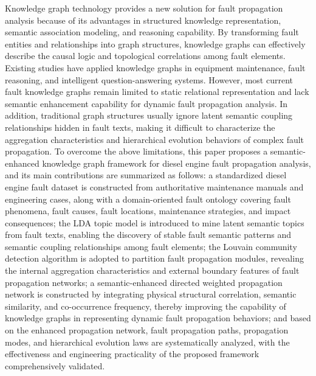 \documentclass[conference]{IEEEconf}
\begin{document}
Knowledge graph technology provides a new solution for fault propagation analysis because of its advantages in structured knowledge representation, semantic association modeling, and reasoning capability\cite{paul2019compact}. By transforming fault entities and relationships into graph structures, knowledge graphs can effectively describe the causal logic and topological correlations among fault elements. Existing studies have applied knowledge graphs in equipment maintenance, fault reasoning, and intelligent question-answering systems. However, most current fault knowledge graphs remain limited to static relational representation and lack semantic enhancement capability for dynamic fault propagation analysis\cite{chen2024information}. In addition, traditional graph structures usually ignore latent semantic coupling relationships hidden in fault texts, making it difficult to characterize the aggregation characteristics and hierarchical evolution behaviors of complex fault propagation.
To overcome the above limitations, this paper proposes a semantic-enhanced knowledge graph framework for diesel engine fault propagation analysis, and its main contributions are summarized as follows: a standardized diesel engine fault dataset is constructed from authoritative maintenance manuals and engineering cases, along with a domain-oriented fault ontology covering fault phenomena, fault causes, fault locations, maintenance strategies, and impact consequences; the LDA topic model is introduced to mine latent semantic topics from fault texts, enabling the discovery of stable fault semantic patterns and semantic coupling relationships among fault elements; the Louvain community detection algorithm is adopted to partition fault propagation modules, revealing the internal aggregation characteristics and external boundary features of fault propagation networks; a semantic-enhanced directed weighted propagation network is constructed by integrating physical structural correlation, semantic similarity, and co-occurrence frequency, thereby improving the capability of knowledge graphs in representing dynamic fault propagation behaviors; and based on the enhanced propagation network, fault propagation paths, propagation modes, and hierarchical evolution laws are systematically analyzed, with the effectiveness and engineering practicality of the proposed framework comprehensively validated.
\end{document}
